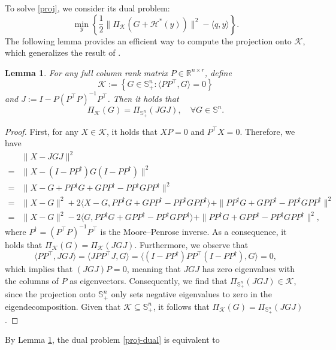 \documentclass[11pt]{article}
\theoremstyle{plain}
\newtheorem{lemma}{Lemma}
\def\H{\mathcal{H}}
\def\<{\big\langle}
\def\>{\big\rangle}
\def\K{\mathcal{K}}
\def\R{\mathbb{R}}
\def\S{\mathbb{S}}
\begin{document}
To solve \eqref{proj}, we consider its dual problem:
\begin{equation}\label{proj-dual}
 \min_y\left\{ \frac{1}{2}\|\Pi_{\K}(G+\H^*(y))\|^2-\langle q,y\rangle \right\}.
 \end{equation}
The following lemma provides an efficient way to compute the projection onto $\K$, which generalizes the result of \cite[Lemma 7]{lee2022escaping}.
\begin{lemma}\label{lemma-proj-JGJ}
For any full column rank matrix $P\in\R^{n\times r}$, define
\[
\K:=\left\{G\in\S^{n}_+:\<PP^\top,G\>=0\right\}
\]
and $J:=I-P(P^\top P)^{-1}P^\top$. Then it holds that 
\[
\Pi_{\K}(G)=\Pi_{\S^{n}_+}(JGJ),\quad \forall G\in \S^n.
\]
\end{lemma}
\begin{proof}
First, for any $X\in \K$, it holds that $XP=0$ and $P^\top X=0$. Therefore, we have
\begin{equation*}
    \begin{aligned}
        &\|X-JGJ\|^2\\
        =&\|X-(I-PP^\dagger)G(I-PP^\dagger)\|^2\\
        =&\|X-G+PP^\dagger G+ GPP^\dagger -PP^\dagger GPP^\dagger\|^2\\
        =&\|X-G\|^2+2\<X-G,PP^\dagger G+ GPP^\dagger - PP^\dagger G PP^\dagger\> + \|PP^\dagger G+ GPP^\dagger - PP^\dagger G PP^\dagger\|^2\\
        =&\|X-G\|^2-2\<G,PP^\dagger G+ GPP^\dagger - PP^\dagger G PP^\dagger\> + \|PP^\dagger G+ GPP^\dagger - PP^\dagger G PP^\dagger\|^2,
    \end{aligned}
\end{equation*}
where $P^\dagger=(P^\top P)^{-1}P^\top$ is the Moore–Penrose inverse. As a consequence, it holds that $\Pi_{\K}(G)=\Pi_{\K}(JGJ)$. Furthermore, we observe that
\[
\langle PP^\top, JGJ \rangle = \langle JPP^\top J, G \rangle = \langle (I - PP^\dagger) PP^\top (I - PP^\dagger), G \rangle = 0,
\]
which implies that $(JGJ)P = 0$, meaning that $JGJ$ has zero eigenvalues 
with the columns of $P$ as eigenvectors. Consequently, we find that $\Pi_{\mathbb{S}^n_+}(JGJ) \in \K$, since the projection onto $\mathbb{S}^n_+$ only sets negative eigenvalues to zero in the eigendecomposition. Given that $\K \subseteq \mathbb{S}^n_+$, it follows that $\Pi_{\K}(G) = \Pi_{\mathbb{S}^n_+}(JGJ)$.
\end{proof}
By Lemma \ref{lemma-proj-JGJ}, the dual problem \eqref{proj-dual} is equivalent to
\end{document}
